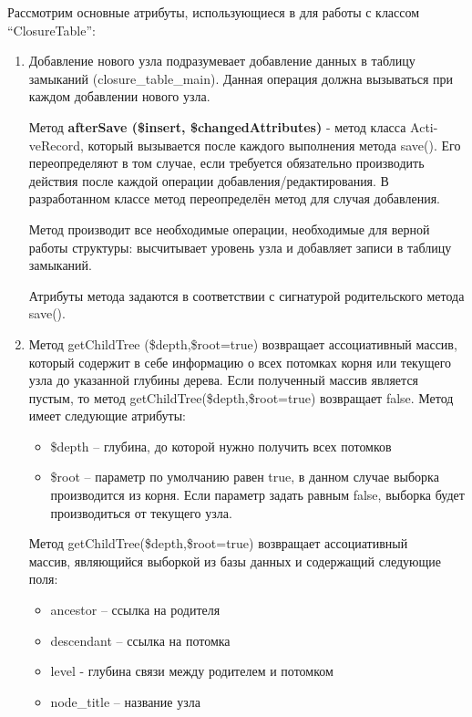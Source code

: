 \documentclass[a4paper,14pt]{extreport}
\theoremstyle{definition}
\begin{document}
Рассмотрим основные атрибуты, использующиеся в для работы с классом “ClosureTable”:
\begin{enumerate}
\item Добавление нового узла подразумевает добавление данных в таблицу замыканий (closure\_table\_main). Данная операция должна вызываться при каждом добавлении нового узла.

Метод \textbf{afterSave (\$insert, \$changedAttributes)} - метод класса Acti-veRecord, который вызывается после каждого выполнения метода save(). Его переопределяют в том случае, если требуется обязательно производить действия после каждой операции добавления/редактирования. В разработанном классе метод переопределён метод для случая добавления.

Метод производит все необходимые операции, необходимые для верной работы структуры: высчитывает уровень узла и добавляет записи в таблицу замыканий.

Атрибуты метода задаются в соответствии с сигнатурой родительского метода save().

\item Метод getChildTree (\$depth,\$root=true)
возвращает ассоциативный массив, который содержит в себе информацию о всех потомках корня или текущего узла до указанной глубины дерева. Если полученный массив является пустым, то метод getChildTree(\$depth,\$root=true) возвращает false.
Метод имеет следующие атрибуты:
\begin{itemize}
\item \$depth – глубина, до которой нужно получить всех потомков
\item \$root – параметр по умолчанию равен true, в данном случае выборка производится из корня. Если параметр задать равным false, выборка будет производиться от текущего узла.
\end{itemize}
Метод getChildTree(\$depth,\$root=true) возвращает ассоциативный \\массив, являющийся выборкой из базы данных и содержащий следующие поля:
\begin{itemize}
\item ancestor – ссылка на родителя
\item descendant – ссылка на потомка
\item level - глубина связи между родителем и потомком
\item node\_title – название узла
\end{itemize}


\end{enumerate}
\end{document}
